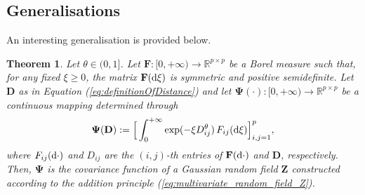 \documentclass[12pt]{article}
\theoremstyle{plain}
\newtheorem{theorem}{Theorem}[section]
\theoremstyle{remark}
\newcommand{\R}[0]{\mathbb{R}}
\newcommand{\latMatr}[1]{\mathbf{#1}}          %
\newcommand{\grMatr}[1]{{\boldsymbol{#1}}}   %
\newcommand{\rVec}[1]{{\bm{#1}}}            %
\newcommand{\tobi}[1]{\textcolor{teal}{#1}}
\begin{document}
\subsection{Generalisations}
    An interesting generalisation is provided below. 
    \begin{theorem} 
        \label{theo:la_raja}
        {Let $\theta \in (0,1]$.} Let $ {\latMatr{F}}: [0,+\infty) \to {\R^{p \times p}}$ be a Borel measure such that, for any fixed $\xi \geq 0$, the matrix $ {{\latMatr{F}} ({\rm d}\xi)}$ 
        is symmetric and positive semidefinite. {Let $\latMatr D$ as in Equation (\ref{eq:definitionOfDistance})} and let $\grMatr \Psi(\cdot): [0,+\infty) \to \mathbb{R}^{p \times p}$ be a continuous mapping determined through
        \begin{equation}
            \label{eq:mapping}
            \grMatr \Psi(\latMatr{D}) := \Big[\int_{0}^{+\infty} \exp(- \xi {{D}_{ij}^\theta}) \,{{F}_{ij}} ({\rm d}\xi)\Big]_{i,j=1}^p,
        \end{equation}
        where ${{F}}_{ij} ({\rm d} \cdot)$ and $D_{ij}$ are the $(i,j)$-th entries of ${\latMatr{F}}({\rm d} \cdot)$ and $\latMatr{D}$, respectively.
        Then, $\grMatr \Psi$ is the covariance function of a Gaussian random field $\rVec Z$ constructed according to the addition principle (\ref{eq:multivariate_random_field_Z}). %
    \end{theorem}
\end{document}

